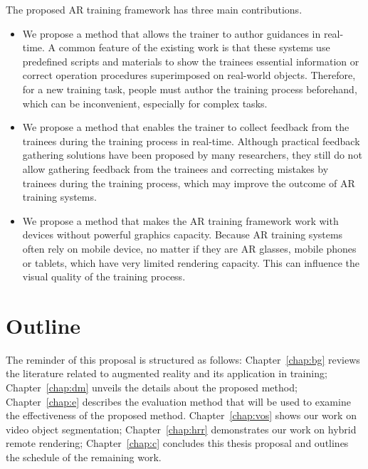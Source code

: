 The proposed AR training framework has three main contributions.

\begin{itemize}
	\item
	We propose a method that allows the trainer to author guidances in real-time. A common feature of the existing work is that these systems use predefined scripts and materials to show the trainees essential information or correct operation procedures superimposed on real-world objects. Therefore, for a new training task, people must author the training process beforehand, which can be inconvenient, especially for complex tasks.
	\item
	We propose a method that enables the trainer to collect feedback from the trainees during the training process in real-time. Although practical feedback gathering solutions have been proposed by many researchers, they still do not allow gathering feedback from the trainees and correcting mistakes by trainees during the training process, which may improve the outcome of AR training systems.
	\item
	We propose a method that makes the AR training framework work with devices without powerful graphics capacity. Because AR training systems often rely on mobile device, no matter if they are AR glasses, mobile phones or tablets, which have very limited rendering capacity. This can influence the visual quality of the training process.
\end{itemize}

\section{Outline}
\label{sec:i:ol}

The reminder of this proposal is structured as follows: Chapter~\ref{chap:bg} reviews the literature related to augmented reality and its application in training; Chapter~\ref{chap:dm} unveils the details about the proposed method; Chapter~\ref{chap:e} describes the evaluation method that will be used to examine the effectiveness of the proposed method. Chapter~\ref{chap:vos} shows our work on video object segmentation; Chapter~\ref{chap:hrr} demonstrates our work on hybrid remote rendering; Chapter~\ref{chap:c} concludes this thesis proposal and outlines the schedule of the remaining work.

